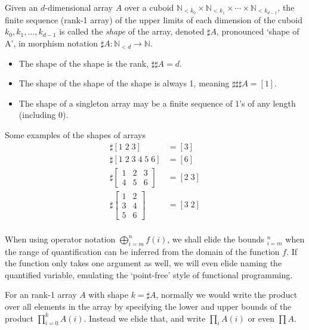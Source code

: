 \documentclass{DIKU-report-variant}
\newcommand\Nat{\mathbb{N}}
\begin{document}
\begin{definition}
  \label{def:shape}
  Given an \(d\)-dimensional array \(A\) over a cuboid
  \(\Nat_{<k_0} \times \Nat_{<k_1} \times \cdots \times \Nat_{<k_{d-1}}\),
  the finite sequence (rank-1 array) of the upper limits of each dimension of the cuboid
  \(k_0, k_1, \dots, k_{d-1}\) is called the \emph{shape} of the array, denoted
  \(\sharp A\), pronounced `shape of A', in morphism notation \(\sharp A : \Nat_{<d} \to \Nat\). 
\end{definition}
\begin{observation}
  \label{ob:shape}
  \begin{itemize}
    \item The shape of the shape is the rank, \(\sharp \sharp A = d\).
    \item The shape of the shape of the shape is always 1, meaning \(\sharp \sharp \sharp A = [1]\).
    \item The shape of a singleton array may be a finite sequence of 1's of any length (including 0).
  \end{itemize}
\end{observation}

\begin{example}
  Some examples of the shapes of arrays
  \begin{align*}
    \sharp [1\; 2\; 3] &= [3] \\
    \sharp [1\; 2\; 3\; 4\; 5\; 6] &= [6] \\
    \sharp \begin{bmatrix}
      1 & 2 & 3 \\ 4 & 5 & 6
    \end{bmatrix} &= [2\; 3] \\
    \sharp \begin{bmatrix}
      1 & 2 \\ 3 & 4 \\ 5 & 6
    \end{bmatrix} &= [3\; 2] \\
  \end{align*}
\end{example}

\begin{remark}
  \label{rem:quant-elision}
  When using operator notation \(\bigoplus_{i=m}^n f(i)\),
  we shall elide the bounds \({}_{i=m}^n\) when the range of quantification can
  be inferred from the domain of the function \(f\). If the function only
  takes one argument as well, we will even elide naming the quantified variable,
  emulating the `point-free' style of functional programming.

  For an rank-1 array \(A\) with shape \(k = \sharp A\), normally we would
  write the product over all elements in the array by specifying the lower
  and upper bounds of the product \(\prod_{i=0}^{k} A(i)\). Instead we elide
  that, and write \(\prod_i A(i)\) or even \(\prod A\).
\end{remark}
\end{document}
